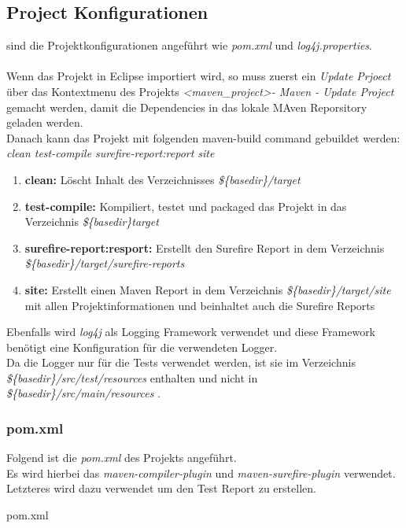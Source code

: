 \documentclass[11pt, a4paper, twoside]{article}   	%
\newenvironment{code}{\captionsetup{type=listing}}{}
\begin{document}
\subsection{Project Konfigurationen}
sind die Projektkonfigurationen angeführt wie \emph{pom.xml} und \emph{log4j.properties}.\\\\
Wenn das Projekt in Eclipse importiert wird, so muss zuerst ein \emph{Update Prjoect} über das Kontextmenu des Projekts \emph{\textless maven\_project\textgreater - Maven - Update Project} gemacht werden, damit die Dependencies in das lokale MAven Reporsitory geladen werden.\\
Danach kann das Projekt mit folgenden maven-build command gebuildet werden:\\
\emph{clean test-compile surefire-report:report site}
\begin{enumerate}
	\item \textbf{clean: } Löscht Inhalt des Verzeichnisses \emph{\$\{basedir\}/target}
	\item \textbf{test-compile: } Kompiliert, testet und packaged das Projekt in das Verzeichnis \emph{\$\{basedir\}target}
	\item \textbf{surefire-report:resport: } Erstellt den Surefire Report in dem Verzeichnis \emph{\$\{basedir\}/target/surefire-reports}
	\item \textbf{site: } Erstellt einen Maven Report in dem Verzeichnis \emph{\$\{basedir\}/target/site} mit allen Projektinformationen und beinhaltet auch die Surefire Reports
\end{enumerate}
Ebenfalls wird \emph{log4j} als Logging Framework verwendet und diese Framework benötigt eine Konfiguration für die verwendeten Logger.\\
Da die Logger nur für die Tests verwendet werden, ist sie im Verzeichnis \emph{\$\{basedir\}/src/test/resources} enthalten und nicht in \emph{\$\{basedir\}/src/main/resources} .\\

\subsubsection{pom.xml}
Folgend ist die \emph{pom.xml} des Projekts angeführt.\\
Es wird hierbei das \emph{maven-compiler-plugin} und \emph{maven-surefire-plugin} verwendet. Letzteres wird dazu verwendet um den Test Report zu erstellen.
\begin{code}
	\caption{pom.xml}
\end{code}
\end{document}
